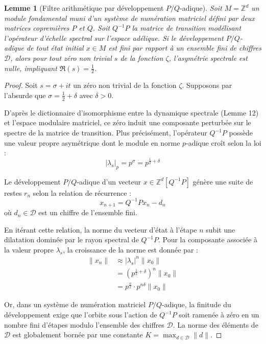 \documentclass[
]{article}
\newtheorem{lemma}{Lemme}
\begin{document}
\begin{lemma}[Filtre arithmétique par développement $P/Q$-adique]
    Soit $M = \mathbb{Z}^d$ un module fondamental muni d'un système de numération matriciel défini par deux matrices copremières $P$ et $Q$. Soit $Q^{-1}P$ la matrice de transition modélisant l'opérateur d'échelle spectral sur l'espace adélique.
    Si le développement $P/Q$-adique de tout état initial $x \in M$ est fini par rapport à un ensemble fini de chiffres $\mathcal{D}$, alors pour tout zéro non trivial $s$ de la fonction $\zeta$, l'asymétrie spectrale est nulle, impliquant $\Re(s) = \frac{1}{2}$.
\end{lemma}

\begin{proof}
Soit $s = \sigma + it$ un zéro non trivial de la fonction $\zeta$. Supposons par l'absurde que $\sigma = \frac{1}{2} + \delta$ avec $\delta > 0$.

D'après le dictionnaire d'isomorphisme entre la dynamique spectrale (Lemme 12) et l'espace modulaire matriciel, ce zéro induit une composante perturbée sur le spectre de la matrice de transition. Plus précisément, l'opérateur $Q^{-1}P$ possède une valeur propre asymétrique dont le module en norme $p$-adique croît selon la loi :
\begin{equation*}
    |\lambda_s|_p = p^{\sigma} = p^{\frac{1}{2} + \delta}
\end{equation*}

Le développement $P/Q$-adique d'un vecteur $x \in \mathbb{Z}^d[Q^{-1}P]$ génère une suite de restes $r_n$ selon la relation de récurrence :
\begin{equation*}
    x_{n+1} = Q^{-1}P x_n - d_n
\end{equation*}
où $d_n \in \mathcal{D}$ est un chiffre de l'ensemble fini.

En itérant cette relation, la norme du vecteur d'état à l'étape $n$ subit une dilatation dominée par le rayon spectral de $Q^{-1}P$. Pour la composante associée à la valeur propre $\lambda_s$, la croissance de la norme est donnée par :
\begin{align*}
    \|x_n\| &\approx |\lambda_s|^n \|x_0\| \\
            &= \left( p^{\frac{1}{2} + \delta} \right)^n \|x_0\| \\
            &= p^{\frac{n}{2}} \cdot p^{n\delta} \|x_0\|
\end{align*}

Or, dans un système de numération matriciel $P/Q$-adique, la finitude du développement exige que l'orbite sous l'action de $Q^{-1}P$ soit ramenée à zéro en un nombre fini d'étapes modulo l'ensemble des chiffres $\mathcal{D}$. La norme des éléments de $\mathcal{D}$ est globalement bornée par une constante $K = \max_{d \in \mathcal{D}} \|d\|$.


\end{proof}
\end{document}
